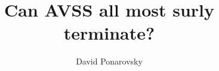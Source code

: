 \documentclass{article}
\begin{document}
\newcommand{\GG}{\tilde{G} }
\newcommand{\TGG}{\(\tilde{G}\) }
\newcommand{\Prb}[1]{ \mathbf{Pr}\left[ {#1} \right] }
\newcommand{\commentt}[1]{\textcolor{blue}{ \textbf{[COMMENT]} #1}}
\newcommand{\ctt}[1]{\commentt{#1}}
\newcommand{\prb}[1]{ \mathbf{Pr} \left[ {#1} \right]}
\newcommand{\onotation}[1]{\(\mathcal{O} \left( {#1}  \right) \)}
\newcommand{\ona}[1]{\onotation{#1}}
\newcommand{\norm}[1]{\left\lVert#1\right\rVert}
\newcommand{\Ov}[2]{\overset{\text{#1}}{\overbrace{#2}}}
\graphicspath{ {./images/} }



\newcommand{\PP}{\mathcal{P} }
\newcommand{\Ue}{ U_{\delta,\varepsilon } }

\setlength{\columnsep}{0.6cm}



\title{  Can AVSS all most surly terminate?   }
\author{David Ponarovsky}
\maketitle
\end{document}
